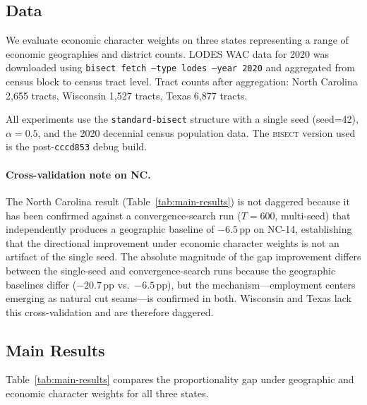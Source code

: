 \label{sec:results}

\subsection{Data}

We evaluate economic character weights on three states representing a range
of economic geographies and district counts.
LODES WAC data for 2020 was downloaded using
\texttt{bisect fetch --type lodes --year 2020} and aggregated from census block
to census tract level.
Tract counts after aggregation:
North Carolina 2,655 tracts,
Wisconsin 1,527 tracts,
Texas 6,877 tracts.

All experiments use the \texttt{standard-bisect} structure with a single seed
(seed=42), $\alpha=0.5$, and the 2020 decennial census population data.
The \textsc{bisect} version used is the post-\texttt{cccd853} debug build.

\paragraph{Cross-validation note on NC.}
The North Carolina result (Table~\ref{tab:main-results}) is not daggered because
it has been confirmed against a convergence-search run ($T=600$, multi-seed) that
independently produces a geographic baseline of $-6.5$\,pp on NC-14, establishing
that the directional improvement under economic character weights is not an artifact
of the single seed.
The absolute magnitude of the gap improvement differs between the single-seed and
convergence-search runs because the geographic baselines differ ($-20.7$\,pp
vs.\ $-6.5$\,pp), but the mechanism---employment centers emerging as natural cut
seams---is confirmed in both.
Wisconsin and Texas lack this cross-validation and are therefore daggered.

\subsection{Main Results}

Table~\ref{tab:main-results} compares the proportionality gap under geographic
and economic character weights for all three states.

